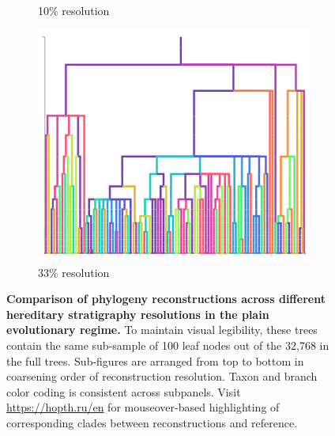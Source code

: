 \begin{figure}
\begin{minipage}{0.5\textwidth}
\begin{subfigure}[b]{\linewidth}
    \caption{%
      10\% resolution}
    \label{fig:plain-perfect-and-reconstruction-phylogenies:resolution_10}
  \end{subfigure}
  \begin{subfigure}[b]{\linewidth}
    \centering
    \includegraphics[width=\textwidth, height=0.13\textheight]{img/plain_resolution_3} \caption{%
      33\% resolution}
    \label{fig:plain-perfect-and-reconstruction-phylogenies:resolution_3}
  \end{subfigure}
  \caption{%
  \textbf{Comparison of phylogeny reconstructions across different hereditary stratigraphy resolutions in the plain evolutionary regime.}
    To maintain visual legibility, these trees contain the same sub-sample of 100 leaf nodes out of the 32,768 in the full trees.
    Sub-figures are arranged from top to bottom in coarsening order of reconstruction resolution.
    Taxon and branch color coding is consistent across subpanels.
    Visit \url{https://hopth.ru/en} for mouseover-based highlighting of corresponding clades between reconstructions and reference.
  }
  \label{fig:plain-perfect-and-reconstruction-phylogenies}
  \end{minipage}
\end{figure}
